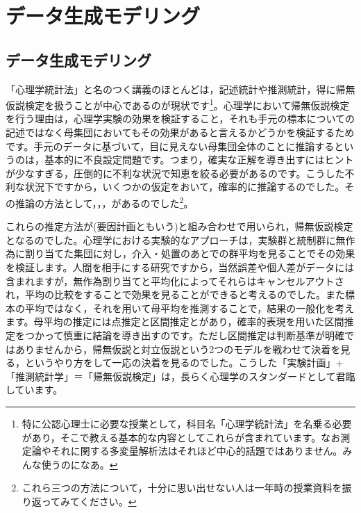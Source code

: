 \documentclass{ltjsbook}
\begin{document}
 
\chapter{データ生成モデリング}
\label{chapter17} 

\section{データ生成モデリング}
「心理学統計法」と名のつく講義のほとんどは，記述統計や推測統計，得に帰無仮説検定を扱うことが中心であるのが現状です\footnote{特に公認心理士に必要な授業として，科目名「心理学統計法」を名乗る必要があり，そこで教える基本的な内容としてこれらが含まれています。なお測定論やそれに関する多変量解析法はそれほど中心的話題ではありません。みんな使うのになあ。}。心理学において帰無仮説検定を行う理由は，心理学実験の効果を検証すること，それも手元の標本についての記述ではなく母集団においてもその効果があると言えるかどうかを検証するためです。手元のデータに基づいて，目に見えない母集団全体のことに推論するというのは，基本的に不良設定問題です。つまり，確実な正解を導き出すにはヒントが少なすぎる，圧倒的に不利な状況で知恵を絞る必要があるのです。こうした不利な状況下ですから，いくつかの仮定をおいて，確率的に推論するのでした。その推論の方法として，，，があるのでした\footnote{これら三つの方法について，十分に思い出せない人は一年時の授業資料を振り返ってみてください。}。

これらの推定方法が(要因計画ともいう)と組み合わせで用いられ，帰無仮説検定となるのでした。心理学における実験的なアプローチは，実験群と統制群に無作為に割り当てた集団に対し，介入・処置のあとでの群平均を見ることでその効果を検証します。人間を相手にする研究ですから，当然誤差や個人差がデータには含まれますが，無作為割り当てと平均化によってそれらはキャンセルアウトされ，平均の比較をすることで効果を見ることができると考えるのでした。また標本の平均ではなく，それを用いて母平均を推測することで，結果の一般化を考えます。母平均の推定には点推定と区間推定とがあり，確率的表現を用いた区間推定をつかって慎重に結論を導き出すのです。ただし区間推定は判断基準が明確ではありませんから，帰無仮説と対立仮説という2つのモデルを戦わせて決着を見る，というやり方をして一応の決着を見るのでした。こうした「実験計画」+「推測統計学」＝「帰無仮説検定」は，長らく心理学のスタンダードとして君臨しています。
\end{document}
